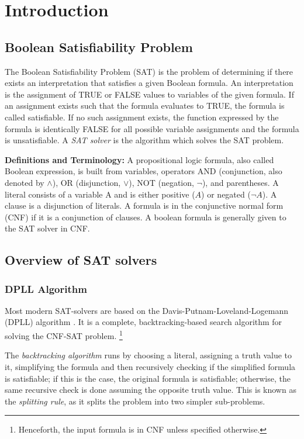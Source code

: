 \chapter{Introduction}

\section{Boolean Satisfiability Problem}

The Boolean Satisfiability Problem (SAT) is the problem of determining if there exists an interpretation that satisfies a given Boolean formula. An interpretation is the assignment of TRUE or FALSE values to variables of the given formula. If an assignment exists such that the formula evaluates to TRUE, the formula is called satisfiable. If no such assignment exists, the function expressed by the formula is identically FALSE for all possible variable assignments and the formula is unsatisfiable. A \textit{SAT solver} is the algorithm which solves the SAT problem.

\textbf{Definitions and Terminology:} A propositional logic formula, also called Boolean expression, is built from variables, operators AND (conjunction, also denoted by $\wedge$), OR (disjunction, $\vee$), NOT (negation, $\neg$), and parentheses. A literal consists of a variable A and is either positive ($A$) or negated
($\neg A$). A clause is a disjunction of literals. A formula is in the conjunctive normal form (CNF) if it is a conjunction of clauses. A boolean formula is generally given to the SAT solver in CNF.

\section{Overview of SAT solvers} 

\subsection{DPLL Algorithm}

Most modern SAT-solvers are based on
the Davis-Putnam-Loveland-Logemann (DPLL) algorithm \cite{DPLL}. It is a complete, backtracking-based search algorithm for solving the CNF-SAT problem. \footnote{Henceforth, the input formula is in CNF unless specified otherwise.}

The \textit{backtracking algorithm} runs by choosing a literal, assigning a truth value to it, simplifying the formula and then recursively checking if the simplified formula is satisfiable; if this is the case, the original formula is satisfiable; otherwise, the same recursive check is done assuming the opposite truth value. This is known as the \textit{splitting rule}, as it splits the problem into two simpler sub-problems.

